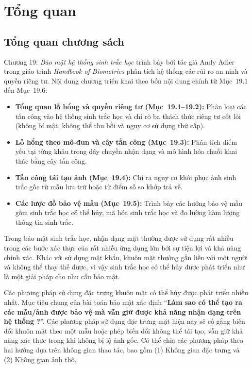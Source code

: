 \section{Tổng quan}
\label{sec:tong-quan}

\subsection{Tổng quan chương sách}
Chương 19: \textit{Bảo mật hệ thống sinh trắc học} trình bày bởi tác giả Andy Adler trong giáo trình \textit{Handbook of Biometrics} phân tích hệ thống các rủi ro an ninh và quyền riêng tư. Nội dung chương triển khai theo bốn nội dung chính từ Mục~19.1 đến Mục~19.6:
\begin{itemize}\setlength{\itemsep}{2pt}\setlength{\parskip}{0pt}
    \item \textbf{Tổng quan lỗ hổng và quyền riêng tư (Mục~19.1--19.2):} Phân loại các tấn công vào hệ thống sinh trắc học và chỉ rõ ba thách thức riêng tư cốt lõi (không bí mật, không thể thu hồi và nguy cơ sử dụng thứ cấp).
    \item \textbf{Lỗ hổng theo mô-đun và cây tấn công (Mục~19.3):} Phân tích điểm yếu tại từng khâu trong dây chuyền nhận dạng và mô hình hóa chuỗi khai thác bằng cây tấn công.
    \item \textbf{Tấn công tái tạo ảnh (Mục~19.4):} Chỉ ra nguy cơ khôi phục ảnh sinh trắc gốc từ mẫu lưu trữ hoặc từ điểm số so khớp trả về.
    \item \textbf{Các lược đồ bảo vệ mẫu (Mục~19.5):} Trình bày các hướng bảo vệ mẫu gồm sinh trắc học có thể hủy, mã hóa sinh trắc học và đo lường hàm lượng thông tin sinh trắc.
\end{itemize}

Trong bảo mật sinh trắc học, nhận dạng mặt thường được sử dụng rất nhiều trong các bước xác thực của rất nhiều ứng dụng lớn bởi sự tiện lợi và khả năng chính xác. Khác với sử dụng mật khẩu, khuôn mặt thường gắn liền với một người và không thể thay thế được, vì vậy sinh trắc học có thể hủy được phát triển như là một giải pháp cho nhu cầu bảo mật.

Các phương pháp sử dụng đặc trưng khuôn mặt có thể hủy được phát triển nhiều nhất. Mục tiêu chung của bài toán bảo mật xác định ``\textbf{Làm sao có thể tạo ra các mẫu/ảnh được bảo vệ mà vẫn giữ được khả năng nhận dạng trên hệ thống ?}''. Các phương pháp sử dụng đặc trưng mặt hiện nay sẽ cố gắng biến đổi khuôn mặt theo một mẫu hoặc phép biến đổi không thể tái tạo, vẫn giữ khả năng xác thực trong khi không bị lộ ảnh gốc. Có thể chia các phương pháp theo hai hướng dựa trên không gian thao tác, bao gồm (1) Không gian đặc trưng và (2) Không gian ảnh thô.


